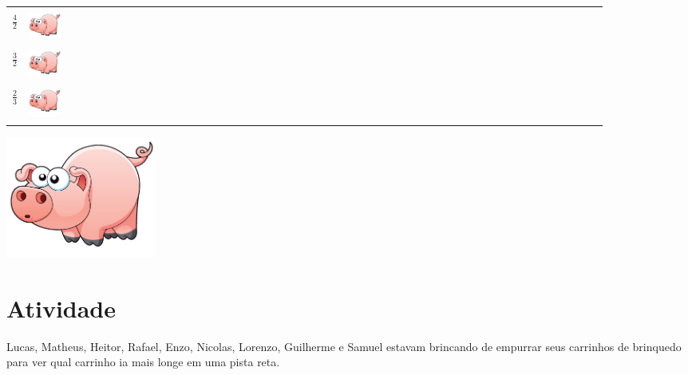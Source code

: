 \documentclass[a4,12pt]{book}
\begin{document}
\begin{center}
\begin{tabulary}{0.8\textwidth}{*{50}{L}}
    \hline \\
      $\frac{4}{2}$  &   \includegraphics[width=30pt, keepaspectratio]{pig}  &  \\
    \hline \\
      $\frac{3}{2}$  &   \includegraphics[width=30pt, keepaspectratio]{pig}  &  \\
    \hline \\
      $\frac{2}{3}$  &   \includegraphics[width=30pt, keepaspectratio]{pig}  &  \\
    \hline \\
  \end{tabulary}
\end{center}






\includegraphics[width=\textwidth,height=4cm, keepaspectratio]{pig}
\section{Atividade}







Lucas, Matheus, Heitor, Rafael, Enzo, Nicolas, Lorenzo, Guilherme e Samuel estavam brincando de empurrar seus carrinhos de brinquedo para ver qual carrinho ia mais longe em uma pista reta.
\end{document}
